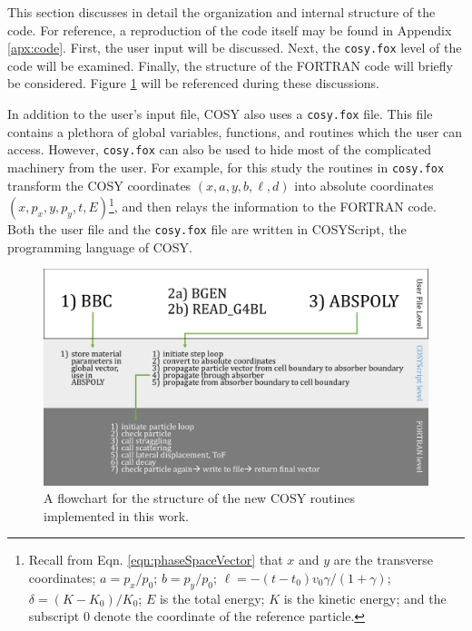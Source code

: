 \label{sec:code_implementation}

This section discusses in detail the organization and internal structure of the code. For reference, a reproduction of the code itself may be found in Appendix \ref{apx:code}. First, the user input will be discussed. Next, the \texttt{cosy.fox} level of the code will be examined. Finally, the structure of the FORTRAN code will briefly be considered. Figure \ref{fig:cosy_flowchart} will be referenced during these discussions.

In addition to the user's input file, COSY also uses a \texttt{cosy.fox} file. This file contains a plethora of global variables, functions, and routines which the user can access. However, \texttt{cosy.fox} can also be used to hide most of the complicated machinery from the user. For example, for this study the routines in \texttt{cosy.fox} transform the COSY coordinates $(x, a, y, b, \ell, d)$ into absolute coordinates $(x, p_x, y, p_y, t, E)$\footnote{Recall from Eqn. \ref{eqn:phaseSpaceVector} that $x$ and $y$ are the transverse coordinates; $a=p_x/p_0$; $b=p_y/p_0$; $\ell=-(t-t_0)v_0\gamma/(1+\gamma)$; $\delta=(K-K_0)/K_0$; $E$ is the total energy; $K$ is the kinetic energy; and the subscript $0$ denote the coordinate of the reference particle.}, and then relays the information to the FORTRAN code. Both the user file and the \texttt{cosy.fox} file are written in COSYScript, the programming language of COSY. 

\begin{figure}[!htb]
  \centering
    \includegraphics[width=\textwidth]{Figures/cosy_flowchart} 
  \caption{A flowchart for the structure of the new COSY routines implemented in this work.}
  \label{fig:cosy_flowchart}
\end{figure}

